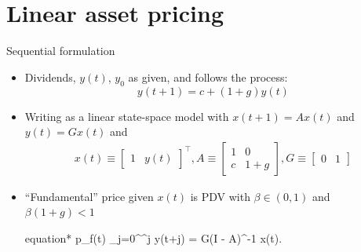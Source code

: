 \documentclass[aspectratio=169,10pt]{beamer}
\begin{document}
\section{Linear asset pricing}

\begin{frame}{Sequential formulation}
	\begin{itemize}
		\item Dividends, $y(t)$, $y_0$ as given, and follows the process:
		\begin{equation*}
			y(t+1) = c + (1+g) y(t)
		\end{equation*}
		\item Writing as a linear state-space model with $x(t+1) = A x(t)$ and $y(t) = G x(t)$ and
		\begin{align*}
			x(t) \equiv \begin{bmatrix*}
				1 & y(t)
			\end{bmatrix*}^\top, A \equiv \begin{bmatrix*}
				1 & 0   \\
				c & 1+g
			\end{bmatrix*}, G \equiv \begin{bmatrix*}
				0 & 1
			\end{bmatrix*}
		\end{align*}
		\item ``Fundamental'' price given $x(t)$ is PDV with $\beta \in (0,1)$ and $\beta(1+g) < 1$
		\begin{empheq}[box=\tcbhighmath]{equation*}
			p_f(t) \equiv \sum_{j=0}^\infty \beta^j y({t+j}) = G(I - \beta A)^{-1} x(t).
		\end{empheq}
	\end{itemize}
\end{frame}
\end{document}

